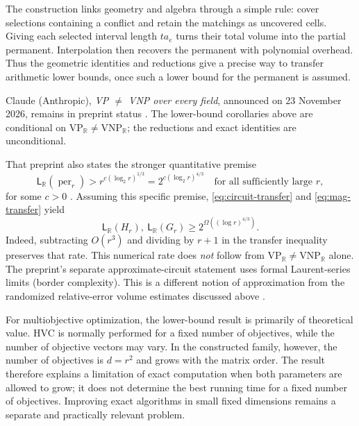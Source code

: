 \documentclass[12pt,a4paper]{article}
\theoremstyle{definition}
\theoremstyle{remark}
\newcommand{\R}{\mathbb R}
\newcommand{\per}{\operatorname{per}}
\newcommand{\VP}{\mathrm{VP}}
\newcommand{\VNP}{\mathrm{VNP}}
\newcommand{\size}{\mathsf L}
\begin{document}
The construction links geometry and algebra through a simple rule:
cover selections containing a conflict and retain the matchings as
uncovered cells. Giving each selected interval length $ta_e$ turns
their total volume into the partial permanent. Interpolation then
recovers the permanent with polynomial overhead. Thus the geometric
identities and reductions give a precise way to transfer arithmetic
lower bounds, once such a lower bound for the permanent is assumed.

Claude (Anthropic), \emph{VP $\ne$ VNP over every field}, announced
on 23 November 2026, remains in preprint status \cite{Claude2026}.
The lower-bound corollaries above are conditional on
$\VP_{\R}\ne\VNP_{\R}$; the reductions and exact identities
are unconditional.

That preprint also states the stronger quantitative premise
\begingroup
\renewcommand*{\theHequation}{announced-permanent}
\begin{equation}
 \size_{\R}(\per_r)>
 r^{c(\log_2 r)^{1/3}}=2^{c(\log_2 r)^{4/3}}
 \quad\text{for all sufficiently large }r,
 \tag{A}\label{eq:announced}
\end{equation}
\endgroup
for some $c>0$ \cite{Claude2026}. Assuming this
specific premise, \eqref{eq:circuit-transfer} and
\eqref{eq:mag-transfer} yield
\begin{equation}
 \size_{\R}(H_r),\ \size_{\R}(G_r)
 \ge 2^{\Omega((\log r)^{4/3})}.
 \label{eq:hv-lower}
\end{equation}
Indeed, subtracting $O(r^3)$ and dividing by $r+1$ in the transfer
inequality preserves that rate. This numerical rate does \emph{not}
follow from $\VP_{\R}\ne\VNP_{\R}$ alone. The preprint's separate
approximate-circuit statement uses formal Laurent-series limits
(border complexity). This is a different notion of approximation from
the randomized relative-error volume estimates discussed above
\cite{Claude2026}.

For multiobjective optimization, the lower-bound result is primarily
of theoretical value. HVC is normally performed
for a fixed number of objectives, while the number of objective
vectors may vary. In the constructed family, however, the number of
objectives is $d=r^2$ and grows with the matrix order. The result
therefore explains a limitation of exact computation when both
parameters are allowed to grow; it does not determine the best
running time for a fixed number of objectives. Improving exact
algorithms in small fixed dimensions remains a separate and
practically relevant problem.
\end{document}
